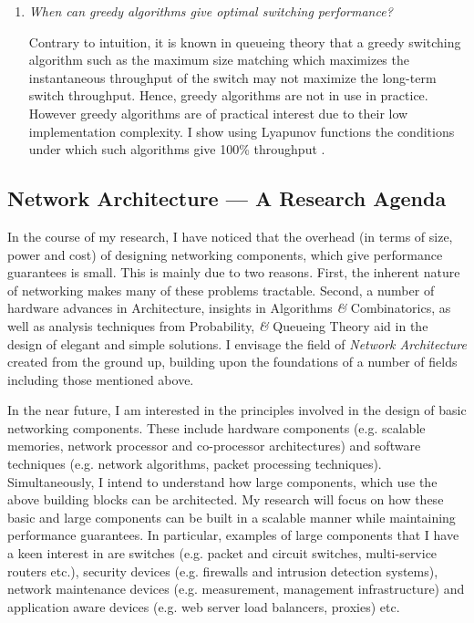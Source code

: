 \documentclass[10pt]{article}
\begin{document}
\begin{small}
\begin{enumerate}
\item {\em When can greedy algorithms give optimal switching performance?}

Contrary to intuition, it is known in queueing theory that a greedy
switching algorithm such as the maximum size matching which
maximizes the instantaneous throughput of the switch may not
maximize the long-term switch throughput. Hence, greedy algorithms
are not in use in practice.
However greedy algorithms are of practical interest due to their low implementation complexity.
I show using Lyapunov functions the conditions under which
such algorithms give 100\% throughput \cite{msm}.

\end{enumerate}

\subsection*{Network Architecture ---  A Research Agenda}

   In the course of my research, I have noticed that the overhead (in terms
of size, power and cost) of designing networking components, which give 
performance guarantees is small. 
This is mainly due to two reasons. First, the inherent nature of 
networking makes many of these problems tractable. Second, a number of
hardware advances in Architecture, insights in Algorithms {\it \&} Combinatorics, 
as well as analysis techniques from Probability, {\it \&} Queueing Theory 
aid in the design of elegant and simple solutions.
I envisage the field of {\it Network Architecture} created from the 
ground up, building upon the foundations of a number of fields
including those mentioned above.

In the near future, I am interested in the 
principles involved in the design of basic networking 
components. These include
hardware components (e.g. scalable memories, 
network processor and co-processor architectures) and 
software techniques (e.g. network algorithms, packet processing 
techniques). 
  Simultaneously, I intend to understand how large components, which use
the above building blocks can be architected.
My research will focus on how these basic and large
components can be built in a scalable manner while maintaining 
performance guarantees. 
In particular, examples of large components that I have a keen
interest in are switches 
(e.g. packet and circuit switches, multi-service routers etc.), 
security devices (e.g. firewalls and intrusion detection 
systems), network maintenance devices (e.g. measurement,
management infrastructure) and application aware devices
(e.g. web server load balancers, proxies) etc. 


\end{small}
\end{document}
